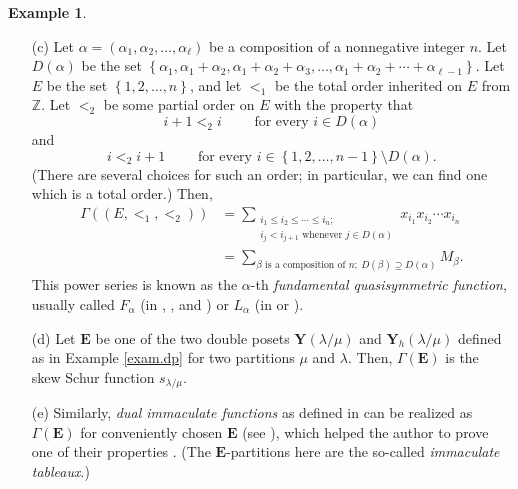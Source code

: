 \documentclass[12pt]{article}
\theoremstyle{plain}
\theoremstyle{definition}
\newtheorem{example}[theorem]{Example}
\theoremstyle{remark}
\let\sumnonlimits\sum
\renewcommand{\sum}{\sumnonlimits\limits}
\newcommand{\EE}{{\mathbf{E}}}
\newcommand{\ZZ}{{\mathbb{Z}}}
\begin{document}
\begin{example}
\begin{enumerate}
\item[(c)] Let
$\alpha = \left(\alpha_1, \alpha_2, \ldots, \alpha_\ell\right)$
be a composition of a nonnegative integer $n$. Let
$D\left(\alpha\right)$ be the set
$\left\{\alpha_1, \alpha_1 + \alpha_2, \alpha_1 + \alpha_2
+ \alpha_3, \ldots, \alpha_1 + \alpha_2 + \cdots + \alpha_{\ell-1}
\right\}$.
Let $E$ be the set $\left\{1, 2, \ldots, n\right\}$, and let
$<_1$ be the total order inherited on $E$ from $\ZZ$. Let $<_2$ be some
partial order on $E$ with the property that
\[
i+1 <_2 i \qquad \text{ for every } i \in D\left(\alpha\right)
\]
and
\[
i <_2 i+1 \qquad \text{ for every }
i \in \left\{1, 2, \ldots, n-1\right\}
\setminus D\left(\alpha\right) .
\]
(There are several choices for such an order; in particular, we
can find one which is a total order.) Then,
\begin{align*}
\Gamma\left(\left(E, <_1, <_2\right)\right)
&= \sum_{\substack{i_1 \leq i_2 \leq \cdots \leq i_n; \\
                  i_j < i_{j+1} \text{ whenever } j \in D\left(\alpha\right)}}
  x_{i_1} x_{i_2} \cdots x_{i_n} \\
&= \sum_{\beta\text{ is a composition of }n;
        \ D\left(\beta\right) \supseteq D\left(\alpha\right)}
  M_\beta .
\end{align*}
This power series is known as the $\alpha$-th
\textit{fundamental quasisymmetric function}, usually called
$F_\alpha$ (in \cite{Gessel}, \cite[\S 2]{Mal-Reu-dua},
\cite[\S 2.4]{BBSSZ} and \cite[\S 2]{Gri-dimm})
or $L_\alpha$ (in \cite[\S 7.19]{Stanley-EC2} or
\cite[Definition 5.15]{Reiner}).

\item[(d)] Let $\EE$ be one of the two double posets
$\mathbf{Y}\left(\lambda / \mu\right)$ and
$\mathbf{Y}_h\left(\lambda / \mu\right)$
defined as in Example \ref{exam.dp} for two partitions $\mu$
and $\lambda$. Then, $\Gamma\left(\EE\right)$ is the skew
Schur function $s_{\lambda / \mu}$.

\item[(e)] Similarly, \textit{dual immaculate functions} as defined in
\cite[\S 3.7]{BBSSZ} can be realized as $\Gamma\left(\EE\right)$
for conveniently chosen $\EE$ (see \cite[Proposition 4.4]{Gri-dimm}), which
helped the author to prove one of their properties \cite{Gri-dimm}.
(The $\EE$-partitions here are the so-called
\textit{immaculate tableaux}.)


\end{enumerate}
\end{example}
\end{document}
